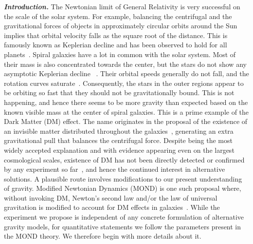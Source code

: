 \documentclass[aps,prd,reprint,superscriptaddress,nofootinbib,floatfix]{revtex4-2}
\begin{document}
\maketitle


\emph{\textbf{Introduction.}}
The Newtonian limit of General Relativity is very successful on the scale of the solar system.
For example, balancing the centrifugal and the gravitational forces of objects in approximately circular orbits around the Sun implies that orbital velocity falls as the square root of the distance. 
This is famously known as Keplerian decline and has been observed to hold for all planets~\cite{NASA-PlanetFactSheet-rel2Earth}.
Spiral galaxies have a lot in common with the solar system. 
Most of their mass is also concentrated towards the center, but the stars do not show any asymptotic Keplerian decline ~\cite{book-DM-Sanders2010}. 
Their orbital speeds generally do not fall, and the rotation curves saturate~\cite{Andromeda-Babock1939}.
Consequently, the stars in the outer regions appear to be orbiting so fast that they should not be gravitationally bound.
This is not happening, and hence there seems to be more gravity than expected based on the known visible mass at the center of spiral galaxies. 
This is a prime example of the Dark Matter (DM) effect. The name originates in the proposal of the existence of an invisible matter distributed throughout the galaxies~\cite{ComaCluster-Zwicky1937}, generating an extra gravitational pull that balances the centrifugal force.
Despite being the most widely accepted explanation and with evidence appearing even on the largest cosmological scales, existence of DM has not been directly detected or confirmed by any experiment so far~\cite{DM-Review-Bertone2018}, and hence the continued interest in alternative solutions.
A plausible route involves modifications to our present understanding of gravity.
Modified Newtonian Dynamics (MOND) is one such proposal where, without invoking DM, Newton's second law and/or the law of universal gravitation is modified to account for DM effects in galaxies~\cite{MOND-Milogram1983}.
While the experiment we propose is independent of any concrete formulation of alternative gravity models, for quantitative statements we follow the parameters present in the MOND theory. We therefore begin with more details about it.
\end{document}

